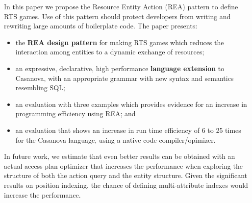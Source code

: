 In this paper we propose the Resource Entity Action (REA) pattern to define RTS games. Use of this pattern should protect developers from writing and rewriting large amounts of boilerplate code. The paper presents:

\begin{itemize}
\item the \textbf{REA design pattern} for making RTS games which reduces the interaction among entities to a dynamic exchange of resources;
\item an expressive, declarative, high performance \textbf{language extension} to Casanova, with an appropriate grammar with new syntax and semantics resembling SQL;
\item an evaluation with three examples which provides evidence for an increase in programming efficiency using REA; and
\item an evaluation that shows an increase in run time efficiency of 6 to 25 times for the Casanova language, using a native code compiler/opimizer.
\end{itemize}

In future work, we estimate that even better results can be obtained with an actual access plan optimizer that increases the performance when exploring the structure of both the action query and the entity structure. Given the significant results on position indexing, the chance of defining multi-attribute indexes would increase the performance.


